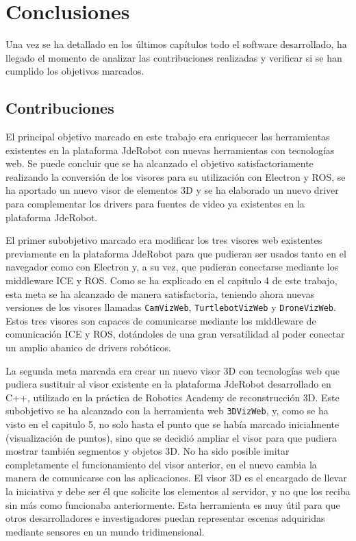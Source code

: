 \chapter{Conclusiones}\label{cap.conclusiones}

Una vez se ha detallado en los últimos capítulos todo el software desarrollado, ha llegado el momento de analizar las contribuciones realizadas y verificar si se han cumplido los objetivos marcados.

\section{Contribuciones}
El principal objetivo marcado en este trabajo era enriquecer las herramientas existentes en la plataforma JdeRobot con nuevas herramientas con tecnologías web. Se puede concluir que se ha alcanzado el objetivo satisfactoriamente realizando la conversión de los visores para su utilización con Electron y ROS, se ha aportado un nuevo visor de elementos 3D y se ha elaborado un nuevo driver para complementar los drivers para fuentes de video ya existentes en la plataforma JdeRobot.

El primer subobjetivo marcado era modificar los tres visores web existentes previamente en la plataforma JdeRobot para que pudieran ser usados tanto en el navegador como con Electron y, a su vez, que pudieran conectarse mediante los middleware ICE y ROS. Como se ha explicado en el capitulo 4 de este trabajo, esta meta se ha alcanzado de manera satisfactoria, teniendo ahora nuevas versiones de los visores llamadas \texttt{CamVizWeb}, \texttt{TurtlebotVizWeb} y \texttt{DroneVizWeb}. Estos tres visores son capaces de comunicarse mediante los middleware de comunicación ICE y ROS, dotándoles de una gran versatilidad al poder conectar un amplio abanico de drivers robóticos.

La segunda meta marcada era crear un nuevo visor 3D con tecnologías web que pudiera sustituir al visor existente en la plataforma JdeRobot desarrollado en C++, utilizado en la práctica de Robotics Academy de reconstrucción 3D. Este subobjetivo se ha alcanzado con la herramienta web \texttt{3DVizWeb}, y, como se ha visto en el capitulo 5, no solo hasta el punto que se había marcado inicialmente (visualización de puntos), sino que se decidió ampliar el visor para que pudiera mostrar también segmentos y objetos 3D. No ha sido posible imitar completamente el funcionamiento del visor anterior, en el nuevo cambia la manera de comunicarse con las aplicaciones. El visor 3D es el encargado de llevar la iniciativa y debe ser él que solicite los elementos al servidor, y no que los reciba sin más como funcionaba anteriormente. Esta herramienta es muy útil para que otros desarrolladores e investigadores puedan representar escenas adquiridas mediante sensores en un mundo tridimensional.

